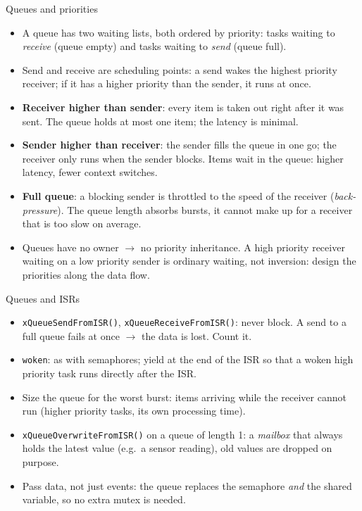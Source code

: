 
\begin{frame}{Queues and priorities}
  \begin{itemize}
    \item A queue has two waiting lists, both ordered by priority: tasks waiting to \emph{receive} (queue empty) and tasks waiting to \emph{send} (queue full).
    \item Send and receive are scheduling points: a send wakes the highest priority receiver; if it has a higher priority than the sender, it runs at once.
    \item \textbf{Receiver higher than sender}: every item is taken out right after it was sent. The queue holds at most one item; the latency is minimal.
    \item \textbf{Sender higher than receiver}: the sender fills the queue in one go; the receiver only runs when the sender blocks. Items wait in the queue: higher latency, fewer context switches.
    \item \textbf{Full queue}: a blocking sender is throttled to the speed of the receiver (\emph{back-pressure}). The queue length absorbs bursts, it cannot make up for a receiver that is too slow on average.
    \item Queues have no owner $\rightarrow$ no priority inheritance. A high priority receiver waiting on a low priority sender is ordinary waiting, not inversion: design the priorities along the data flow.
  \end{itemize}
\end{frame}

\begin{frame}{Queues and ISRs}
  \begin{itemize}
    \item \texttt{xQueueSendFromISR()}, \texttt{xQueueReceiveFromISR()}: never block. A send to a full queue fails at once $\rightarrow$ the data is lost. Count it.
    \item \texttt{woken}: as with semaphores; yield at the end of the ISR so that a woken high priority task runs directly after the ISR.
    \item Size the queue for the worst burst: items arriving while the receiver cannot run (higher priority tasks, its own processing time).
    \item \texttt{xQueueOverwriteFromISR()} on a queue of length 1: a \emph{mailbox} that always holds the latest value (e.g.\ a sensor reading), old values are dropped on purpose.
    \item Pass data, not just events: the queue replaces the semaphore \emph{and} the shared variable, so no extra mutex is needed.
  \end{itemize}
\end{frame}


